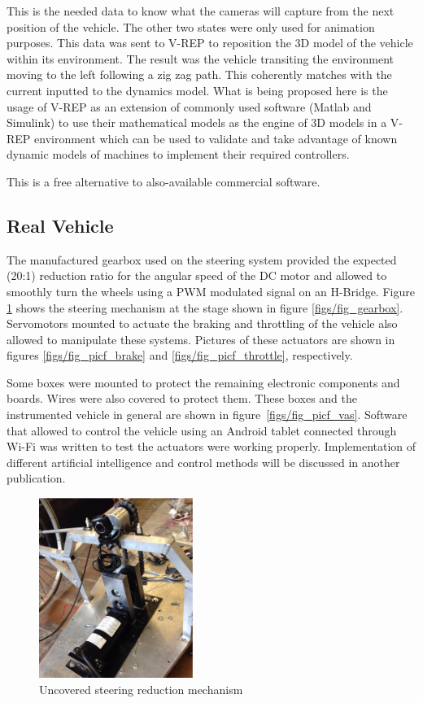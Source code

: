 \documentclass[twocolumn,10pt]{asme2e}
\begin{document}
This is the needed data to know what the cameras will capture from the next position of the vehicle. The other two states were only used for animation purposes. This data was sent to V-REP to reposition the 3D model of the vehicle within its environment. The result was the vehicle transiting the environment moving to the left following a zig zag path. This coherently matches with the current inputted to the dynamics model. What is being proposed here is the usage of V-REP as an extension of commonly used software (Matlab and Simulink) to use their mathematical models as the engine of 3D models in a V-REP environment which can be used to validate and take advantage of known dynamic models of machines to implement their required controllers.

This is a free alternative to also-available commercial software.

\subsection*{Real Vehicle}
The manufactured gearbox used on the steering system provided the expected (20:1) reduction ratio for the angular speed of the DC motor and allowed to smoothly turn the wheels using a PWM modulated signal on an H-Bridge. Figure \ref{figs/fig_picf_steer} shows the steering mechanism at the stage shown in figure \ref{figs/fig_gearbox}. Servomotors mounted to actuate the braking and throttling of the vehicle also allowed to manipulate these systems. Pictures of these actuators are shown in figures \ref{figs/fig_picf_brake} and \ref{figs/fig_picf_throttle}, respectively. 

Some boxes were mounted to protect the remaining electronic components and boards. Wires were also covered to protect them. These boxes and the instrumented vehicle in general are shown in figure~\ref{figs/fig_picf_vas}. Software that allowed to control the vehicle using an Android tablet connected through Wi-Fi was written to test the actuators were working properly. Implementation of different artificial intelligence and control methods will be discussed in another publication.

\begin{figure}
\begin{center}
\includegraphics[width=5cm]{figs/fig_picf_steer.eps}
\caption{Uncovered steering reduction mechanism}
\label{figs/fig_picf_steer}
\end{center}
\end{figure}
\end{document}
